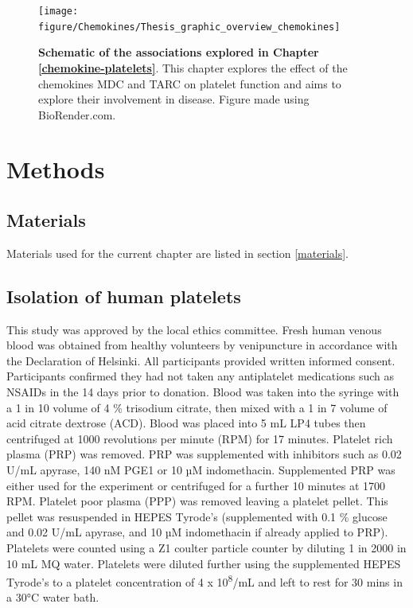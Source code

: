 \documentclass[11pt,twoside]{bristolthesis}
\begin{document}
\begin{figure}

{\centering \texttt{[image: figure/Chemokines/Thesis\_graphic\_overview\_chemokines]} 

}

\caption[Schematic of the associations explored in Chapter \ref{chemokine-platelets}]{\textbf{Schematic of the associations explored in Chapter \ref{chemokine-platelets}}. This chapter explores the effect of the chemokines MDC and TARC on platelet function and aims to explore their involvement in disease. Figure made using BioRender.com.}\label{fig:chemokine-platelet-graphic}
\end{figure}
\hypertarget{methods-1}{%
\section{Methods}\label{methods-1}}

\hypertarget{materials-1}{%
\subsection{Materials}\label{materials-1}}

Materials used for the current chapter are listed in section \ref{materials}.

\hypertarget{isolation-of-human-platelets}{%
\subsection{Isolation of human platelets}\label{isolation-of-human-platelets}}

This study was approved by the local ethics committee. Fresh human venous blood was obtained from healthy volunteers by venipuncture in accordance with the Declaration of Helsinki. All participants provided written informed consent. Participants confirmed they had not taken any antiplatelet medications such as NSAIDs in the 14 days prior to donation. Blood was taken into the syringe with a 1 in 10 volume of 4 \% trisodium citrate, then mixed with a 1 in 7 volume of acid citrate dextrose (ACD). Blood was placed into 5 mL LP4 tubes then centrifuged at 1000 revolutions per minute (RPM) for 17 minutes. Platelet rich plasma (PRP) was removed. PRP was supplemented with inhibitors such as 0.02 U/mL apyrase, 140 nM PGE1 or 10 µM indomethacin. Supplemented PRP was either used for the experiment or centrifuged for a further 10 minutes at 1700 RPM. Platelet poor plasma (PPP) was removed leaving a platelet pellet. This pellet was resuspended in HEPES Tyrode's (supplemented with 0.1 \% glucose and 0.02 U/mL apyrase, and 10 µM indomethacin if already applied to PRP). Platelets were counted using a Z1 coulter particle counter by diluting 1 in 2000 in 10 mL MQ water. Platelets were diluted further using the supplemented HEPES Tyrode's to a platelet concentration of 4 x 10\textsuperscript{8}/mL and left to rest for 30 mins in a 30°C water bath.
\end{document}
